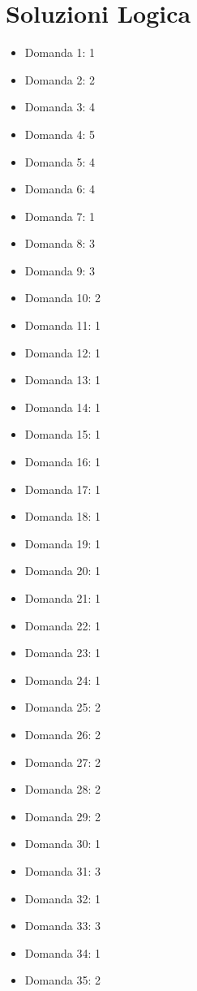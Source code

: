 \documentclass[20pt, a4paper]{article}
\begin{document}
\section*{Soluzioni Logica}
\begin{itemize}[leftmargin=*]
\item [Logica] Domanda 1: 1
\item [Logica] Domanda 2: 2
\item [Logica] Domanda 3: 4
\item [Logica] Domanda 4: 5
\item [Logica] Domanda 5: 4
\item [Logica] Domanda 6: 4
\item [Logica] Domanda 7: 1
\item [Logica] Domanda 8: 3
\item [Logica] Domanda 9: 3
\item [Logica] Domanda 10: 2
\item [Logica] Domanda 11: 1
\item [Logica] Domanda 12: 1
\item [Logica] Domanda 13: 1
\item [Logica] Domanda 14: 1
\item [Logica] Domanda 15: 1
\item [Logica] Domanda 16: 1
\item [Logica] Domanda 17: 1
\item [Logica] Domanda 18: 1
\item [Logica] Domanda 19: 1
\item [Logica] Domanda 20: 1
\item [Logica] Domanda 21: 1
\item [Logica] Domanda 22: 1
\item [Logica] Domanda 23: 1
\item [Logica] Domanda 24: 1
\item [Logica] Domanda 25: 2
\item [Logica] Domanda 26: 2
\item [Logica] Domanda 27: 2
\item [Logica] Domanda 28: 2
\item [Logica] Domanda 29: 2
\item [Logica] Domanda 30: 1
\item [Logica] Domanda 31: 3
\item [Logica] Domanda 32: 1
\item [Logica] Domanda 33: 3
\item [Logica] Domanda 34: 1
\item [Logica] Domanda 35: 2

\end{itemize}
\end{document}
